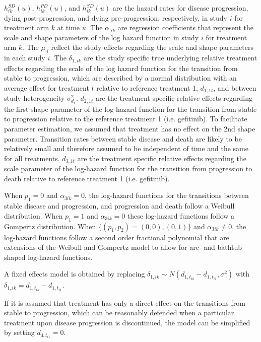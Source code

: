 \documentclass[11pt,final,fleqn]{article}\usepackage[]{graphicx}\usepackage[]{color}
\theoremstyle{plain}
\begin{document}
{$h_{ik}^{SD}(u)$, $h_{ik}^{PD}(u)$, and $h_{ik}^{SD}(u)$ are the hazard rates for disease progression, dying post-progression, and dying pre-progression, respectively, in study $i$ for treatment arm $k$ at time $u$. The $\alpha_{\cdot ik}$ are regression coefficients that represent the scale and shape parameters of the log hazard function in study $i$ for treatment arm $k$. The $\mu_{\cdot i}$ reflect the study effects regarding the scale and shape parameters in each study $i$. The $\delta_{1,ik} $ are the study specific true underlying relative treatment effects regarding the scale of the log hazard function for the transition from stable to progression, which are described by a normal distribution with an average effect for treatment $t$ relative to reference treatment 1, ${d_{1,1t}}$, and between study heterogeneity $\sigma_{d_{1}}^{2} $.  ${d_{2,1t}}$ are the treatment specific relative effects regarding the first shape parameter of the log hazard function for the transition from stable to progression relative to the reference treatment 1 (i.e. gefitinib). To facilitate parameter estimation, we assumed that treatment has no effect on the 2nd shape parameter. Transition rates between stable disease and death are likely to be relatively small and therefore assumed to be independent of time and the same for all treatments. ${d_{3,1t}}$ are the treatment specific relative effects regarding the scale parameter of the log-hazard function for the transition from progression to death relative to reference treatment 1 (i.e. gefitinib). 

When $p_{1}=0$ and $\alpha_{3ik}=0$, the log-hazard functions for the transitions between stable disease and progression, and progression and death follow a Weibull distribution. When $p_{1}=1$ and $\alpha_{3ik}=0$ these log-hazard functions follow a Gompertz distribution. When $\{(p_1, p_2) = (0, 0), (0,1)\}$ and $\alpha_{3ik}\neq0$, the log-hazard functions follow a second order fractional polynomial that are extensions of the Weibull and Gompertz model to allow for arc- and bathtub shaped log-hazard functions. 

A fixed effects model is obtained by replacing $\delta_{1,ik} \sim N(d_{1, t_{ik}} - d_{1, t_{i1}}, \sigma^2)$ with $\delta_{1,ik} = d_{1, t_{ik}} - d_{1, t_{i1}}$. 

If it is assumed that treatment has only a direct effect on the transitions from stable to progression, which can be reasonably defended when a particular treatment upon disease progression is discontinued, the model can be simplified by setting $d_{3, t_{i1}}=0$.


}
\end{document}
